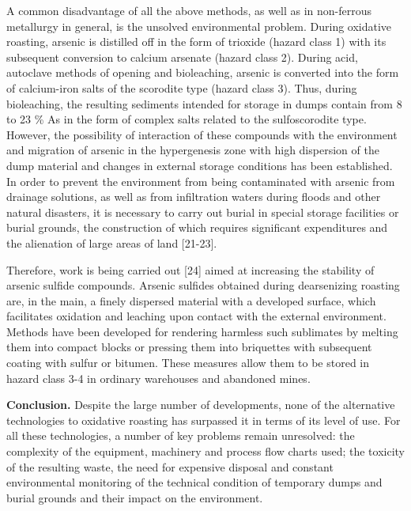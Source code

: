A common disadvantage of all the above methods, as well as in
non-ferrous metallurgy in general, is the unsolved environmental
problem. During oxidative roasting, arsenic is distilled off in the form
of trioxide (hazard class 1) with its subsequent conversion to calcium
arsenate (hazard class 2). During acid, autoclave methods of opening and
bioleaching, arsenic is converted into the form of calcium-iron salts of
the scorodite type (hazard class 3). Thus, during bioleaching, the
resulting sediments intended for storage in dumps contain from 8 to 23
\% As in the form of complex salts related to the sulfoscorodite type.
However, the possibility of interaction of these compounds with the
environment and migration of arsenic in the hypergenesis zone with high
dispersion of the dump material and changes in external storage
conditions has been established. In order to prevent the environment
from being contaminated with arsenic from drainage solutions, as well as
from infiltration waters during floods and other natural disasters, it
is necessary to carry out burial in special storage facilities or burial
grounds, the construction of which requires significant expenditures and
the alienation of large areas of land {[}21-23{]}.

Therefore, work is being carried out {[}24{]} aimed at increasing the
stability of arsenic sulfide compounds. Arsenic sulfides obtained during
dearsenizing roasting are, in the main, a finely dispersed material with
a developed surface, which facilitates oxidation and leaching upon
contact with the external environment. Methods have been developed for
rendering harmless such sublimates by melting them into compact blocks
or pressing them into briquettes with subsequent coating with sulfur or
bitumen. These measures allow them to be stored in hazard class 3-4 in
ordinary warehouses and abandoned mines.

{\bfseries Conclusion.} Despite the large number of developments, none of
the alternative technologies to oxidative roasting has surpassed it in
terms of its level of use. For all these technologies, a number of key
problems remain unresolved: the complexity of the equipment, machinery
and process flow charts used; the toxicity of the resulting waste, the
need for expensive disposal and constant environmental monitoring of the
technical condition of temporary dumps and burial grounds and their
impact on the environment.

